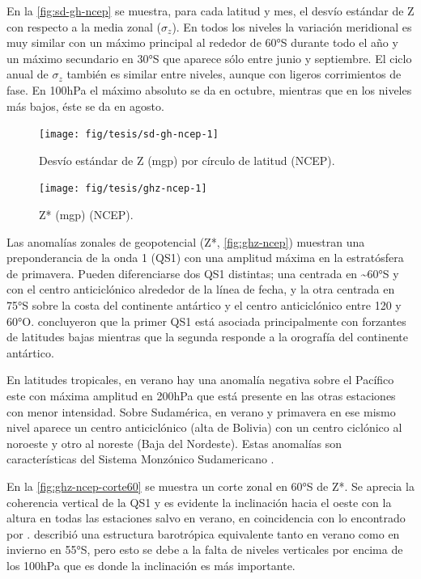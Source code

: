 \documentclass[spanish,a4paper,12pt,oneside]{book}
\begin{document}
En la \autoref{fig:sd-gh-ncep} se muestra, para cada latitud y mes, el
desvío estándar de Z con respecto a la media zonal (\(\sigma_z\)). En
todos los niveles la variación meridional es muy similar con un máximo
principal al rededor de 60°S durante todo el año y un máximo secundario
en 30°S que aparece sólo entre junio y septiembre. El ciclo anual de
\(\sigma_z\) también es similar entre niveles, aunque con ligeros
corrimientos de fase. En 100hPa el máximo absoluto se da en octubre,
mientras que en los niveles más bajos, éste se da en agosto.

\begin{figure}
\texttt{[image: fig/tesis/sd-gh-ncep-1]} \caption{Desvío estándar de Z (mgp) por círculo de latitud (NCEP).}\label{fig:sd-gh-ncep}
\end{figure}

\begin{landscape}\begin{figure}

{\centering \texttt{[image: fig/tesis/ghz-ncep-1]} 

}

\caption{Z* (mgp) (NCEP).}\label{fig:ghz-ncep}
\end{figure}
\end{landscape}

Las anomalías zonales de geopotencial (Z*, \autoref{fig:ghz-ncep})
muestran una preponderancia de la onda 1 (QS1) con una amplitud máxima
en la estratósfera de primavera. Pueden diferenciarse dos QS1 distintas;
una centrada en \textasciitilde{}60°S y con el centro anticiclónico
alrededor de la línea de fecha, y la otra centrada en 75°S sobre la
costa del continente antártico y el centro anticiclónico entre 120 y
60°O. \textcite{Quintanar1995} concluyeron que la primer QS1 está
asociada principalmente con forzantes de latitudes bajas mientras que la
segunda responde a la orografía del continente antártico.

En latitudes tropicales, en verano hay una anomalía negativa sobre el
Pacífico este con máxima amplitud en 200hPa que está presente en las
otras estaciones con menor intensidad. Sobre Sudamérica, en verano y
primavera en ese mismo nivel aparece un centro anticiclónico (alta de
Bolivia) con un centro ciclónico al noroeste y otro al noreste (Baja del
Nordeste). Estas anomalías son características del Sistema Monzónico
Sudamericano \autocite{Vera2006}.

En la \autoref{fig:ghz-ncep-corte60} se muestra un corte zonal en 60°S
de Z*. Se aprecia la coherencia vertical de la QS1 y es evidente la
inclinación hacia el oeste con la altura en todas las estaciones salvo
en verano, en coincidencia con lo encontrado por
\textcite{Quintanar1995a}. \textcite{Karoly1985} describió una
estructura barotrópica equivalente tanto en verano como en invierno en
55°S, pero esto se debe a la falta de niveles verticales por encima de
los 100hPa que es donde la inclinación es más importante.
\end{document}

